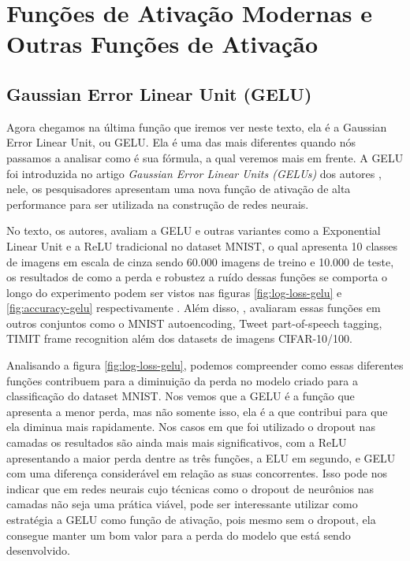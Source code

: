 
\chapter{Funções de Ativação Modernas e Outras Funções de Ativação}
\label{cap:ativacao-modernas-outras}

\section{Gaussian Error Linear Unit (GELU)}

Agora chegamos na última função que iremos ver neste texto, ela é a Gaussian Error Linear Unit, ou GELU. Ela é uma das mais diferentes quando nós passamos a analisar como é sua fórmula, a qual veremos mais em frente. A GELU foi introduzida no artigo \textit{Gaussian Error Linear Units (GELUs)} dos autores \textcite{gelu}, nele, os pesquisadores apresentam uma nova função de ativação de alta performance para ser utilizada na construção de redes neurais.

No texto, os autores, avaliam a GELU e outras variantes como a Exponential Linear Unit e a ReLU tradicional no dataset MNIST, o qual apresenta 10 classes de imagens em escala de cinza sendo 60.000 imagens de treino e 10.000 de teste, os resultados de como a perda e robustez a ruído dessas funções se comporta o longo do experimento podem ser vistos nas figuras \ref{fig:log-loss-gelu} e \ref{fig:accuracy-gelu} respectivamente \parencite{gelu}. Além disso, \textcite{gelu}, avaliaram essas funções em outros conjuntos como o MNIST autoencoding, Tweet part-of-speech tagging, TIMIT frame recognition além dos datasets de imagens CIFAR-10/100. 

Analisando a figura \ref{fig:log-loss-gelu}, podemos compreender como essas diferentes funções contribuem para a diminuição da perda no modelo criado para a classificação do dataset MNIST. Nos vemos que a GELU é a função que apresenta a menor perda, mas não somente isso, ela é a que contribui para que ela diminua mais rapidamente. Nos casos em que foi utilizado o dropout nas camadas os resultados são ainda mais mais significativos, com a ReLU apresentando a maior perda dentre as três funções, a ELU em segundo, e GELU com uma diferença considerável em relação as suas concorrentes. Isso pode nos indicar que em redes neurais cujo técnicas como o dropout de neurônios nas camadas não seja uma prática viável, pode ser interessante utilizar como estratégia a GELU como função de ativação, pois mesmo sem o dropout, ela consegue manter um bom valor para a perda do modelo que está sendo desenvolvido.

